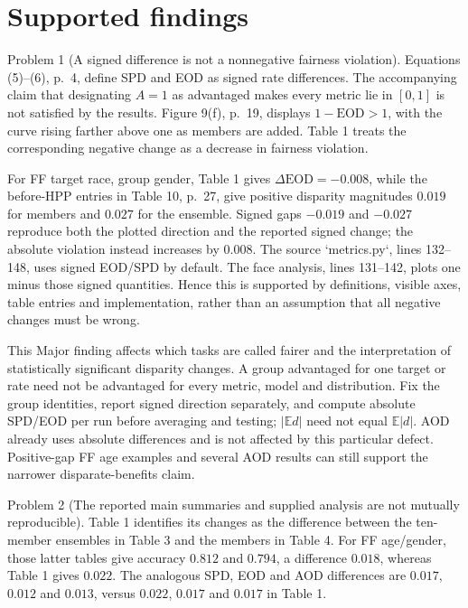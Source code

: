 \documentclass[10pt]{article}
\begin{document}
\section*{Supported findings}
Problem 1 (A signed difference is not a nonnegative fairness violation).  Equations (5)–(6), p. 4, define SPD and EOD as signed rate differences. The accompanying claim that designating \(A=1\) as advantaged makes every metric lie in \([0,1]\) is not satisfied by the results. Figure 9(f), p. 19, displays \(1-\mathrm{EOD}>1\), with the curve rising farther above one as members are added. Table 1 treats the corresponding negative change as a decrease in fairness violation.\par
For FF target race, group gender, Table 1 gives \(\Delta\mathrm{EOD}=-0.008\), while the before-HPP entries in Table 10, p. 27, give positive disparity magnitudes \(0.019\) for members and \(0.027\) for the ensemble. Signed gaps \(-0.019\) and \(-0.027\) reproduce both the plotted direction and the reported signed change; the absolute violation instead increases by \(0.008\). The source `metrics.py`, lines 132–148, uses signed EOD/SPD by default. The face analysis, lines 131–142, plots one minus those signed quantities. Hence this is supported by definitions, visible axes, table entries and implementation, rather than an assumption that all negative changes must be wrong.\par
This Major finding affects which tasks are called fairer and the interpretation of statistically significant disparity changes. A group advantaged for one target or rate need not be advantaged for every metric, model and distribution. Fix the group identities, report signed direction separately, and compute absolute SPD/EOD per run before averaging and testing; \(|\mathbb E d|\) need not equal \(\mathbb E|d|\). AOD already uses absolute differences and is not affected by this particular defect. Positive-gap FF age examples and several AOD results can still support the narrower disparate-benefits claim.\par
Problem 2 (The reported main summaries and supplied analysis are not mutually reproducible).  Table 1 identifies its changes as the difference between the ten-member ensembles in Table 3 and the members in Table 4. For FF age/gender, those latter tables give accuracy \(0.812\) and \(0.794\), a difference \(0.018\), whereas Table 1 gives \(0.022\). The analogous SPD, EOD and AOD differences are \(0.017\), \(0.012\) and \(0.013\), versus \(0.022\), \(0.017\) and \(0.017\) in Table 1.\par
\end{document}
